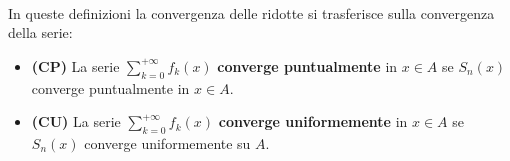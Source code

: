 \begin{define}~{}\\
	In queste definizioni la convergenza delle ridotte si trasferisce sulla convergenza della serie:
	\begin{itemize}
		\item \textbf{(CP)} La serie $\displaystyle\sum_{k=0}^{+\infty}f_k\left(x\right)$ \textbf{converge puntualmente} in $x\in A$ se $S_n\left(x\right)$ converge puntualmente in $x\in A$.
		\item \textbf{(CU)} La serie $\displaystyle\sum_{k=0}^{+\infty}f_k\left(x\right)$ \textbf{converge uniformemente} in $x\in A$ se $S_n\left(x\right)$ converge uniformemente su $A$.
	\end{itemize}
\end{define}

